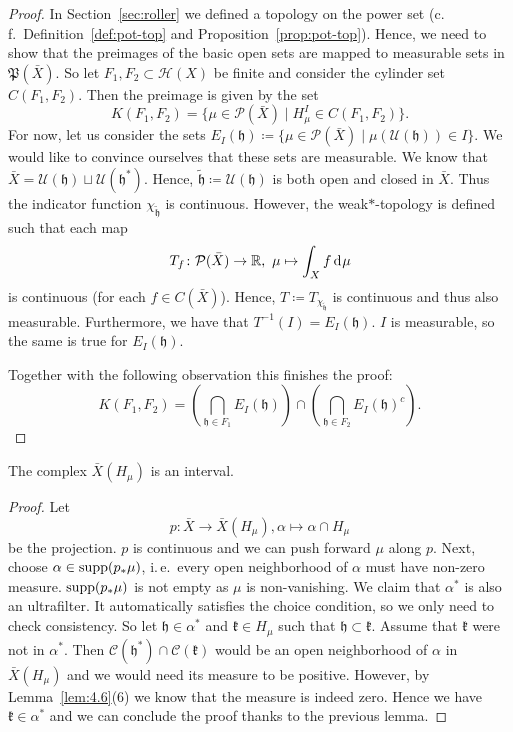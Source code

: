 \begin{proof}
  In Section~\ref{sec:roller} we defined a topology on the power set (c.\,f.\ Definition~\ref{def:pot-top} and Proposition~\ref{prop:pot-top}). Hence, we need to show that the preimages of the basic open sets are mapped to measurable sets in \(\mathfrak{P}(\bar X)\). So let \(F_1, F_2 \subset \mathcal{H}(X)\) be finite and consider the cylinder set \(C(F_1, F_2)\). Then the preimage is given by the set
  \[
    K(F_1, F_2) = \{\mu \in \mathcal{P}(\bar X) \mid H^I_\mu \in C(F_1, F_2)\}.
  \]
  For now, let us consider the sets \(E_I(\mathfrak{h}) \coloneqq \{\mu \in \mathcal{P}(\bar X) \mid \mu(\mathcal{U}(\mathfrak{h})) \in I\}\). We would like to convince ourselves that these sets are measurable. We know that \(\bar X = \mathcal{U}(\mathfrak{h}) \sqcup \mathcal{U}(\mathfrak{h}^\ast)\). Hence, \(\mathfrak{\tilde h} \coloneqq \mathcal{U}(\mathfrak{h})\) is both open and closed in \(\bar X\). Thus the indicator function \(\chi_{\mathfrak{\tilde h}}\) is continuous. However, the weak\(\ast\)-topology is defined such that each map
  \[
    T_f\colon \mathcal{P}(\bar X) \to \R,\ \mu \mapsto \int_X f \d\mu
  \]
  is continuous (for each \(f \in C(\bar X)\)). Hence, \(T \coloneqq T_{\chi_{\mathfrak{\tilde h}}}\) is continuous and thus also measurable. Furthermore, we have that \(T^{-1}(I) = E_I(\mathfrak{h})\). \(I\) is measurable, so the same is true for \(E_I(\mathfrak{h})\).

  Together with the following observation this finishes the proof:
  \[
    K(F_1, F_2) = \left (\bigcap_{\mathfrak{h} \in F_1} E_I(\mathfrak{h}) \right ) \cap \left ( \bigcap_{\mathfrak{h} \in F_2} E_I(\mathfrak{h})^{c}\right).
  \]
\end{proof}

\begin{lemma}[{\cite[Lem. 4.7]{MR3509968}}]
  \label{lem:interval}
  The complex \(\bar X(H_\mu)\) is an interval.
\end{lemma}

\begin{proof}
  Let
  \[
    p \colon \bar X \to \bar X (H_\mu), \alpha \mapsto \alpha \cap H_\mu
  \]
  be the projection. \(p\) is continuous and we can push forward \(\mu\) along \(p\). Next, choose \(\alpha \in \operatorname{supp}(p_\ast \mu)\), i.\,e.\ every open neighborhood of \(\alpha\) must have non-zero measure. \(\operatorname{supp}(p_\ast \mu)\) is not empty as \(\mu\) is non-vanishing. We claim that \(\alpha^\ast\) is also an ultrafilter. It automatically satisfies the choice condition, so we only need to check consistency. So let \(\mathfrak{h} \in \alpha^\ast\) and \(\mathfrak{k} \in H_\mu\) such that \(\mathfrak{h} \subset \mathfrak{k}\). Assume that \(\mathfrak{k}\) were not in \(\alpha^\ast\). Then \(\mathcal{C}(\mathfrak{h^\ast}) \cap \mathcal{C}(\mathfrak{k})\) would be an open neighborhood of \(\alpha\) in \(\bar X(H_\mu)\) and we would need its measure to be positive. However, by Lemma~\ref{lem:4.6}(6) we know that the measure is indeed zero. Hence we have \(\mathfrak{k} \in \alpha^\ast\) and we can conclude the proof thanks to the previous lemma.
\end{proof}

